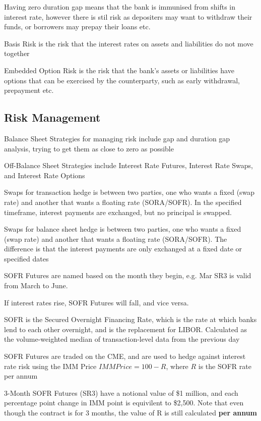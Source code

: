 Having zero duration gap means that the bank is immunised from shifts in interest rate, however there is stil risk as depositers may want to 
withdraw their funds, or borrowers may prepay their loans etc.

Basis Risk is the risk that the interest rates on assets and liabilities do not move together

Embedded Option Risk is the risk that the bank's assets or liabilities have options that can be exercised by the counterparty, such as early withdrawal, prepayment etc.

\subsection{Risk Management}
Balance Sheet Strategies for managing risk include gap and duration
gap analysis, trying to get them as close to zero as possible

Off-Balance Sheet Strategies include Interest Rate Futures, Interest Rate Swaps, and Interest Rate Options

Swaps for transaction hedge is between two parties, one who wants a fixed (swap rate) and another that wants a floating rate (SORA/SOFR).
In the specified timeframe, interest payments are exchanged, but no principal is swapped.

Swaps for balance sheet hedge is between two parties, one who wants a fixed (swap rate) and another that wants a floating rate (SORA/SOFR).
The difference is that the interest payments are only exchanged at a fixed date or specified dates

\begin{callout}
	SOFR Futures are named based on the month they begin, e.g. Mar SR3 is valid from March to June.

	If interest rates rise, SOFR Futures will fall, and vice versa.
\end{callout}

SOFR is the Secured Overnight Financing Rate, which is the rate at which banks lend to each other overnight, and is the replacement for LIBOR.
Calculated as the volume-weighted median of transaction-level data from the previous day

SOFR Futures are traded on the CME, and are used to hedge against interest rate risk using the IMM Price
$IMM Price = 100 - R$, where $R$ is the SOFR rate per annum

3-Month SOFR Futures (SR3) have a notional value of \$1 million, and each percentage point change in IMM point is equivilent to \$2,500. Note that even though the contract is for 3 months, the value of R is still calculated \textbf{per annum}

